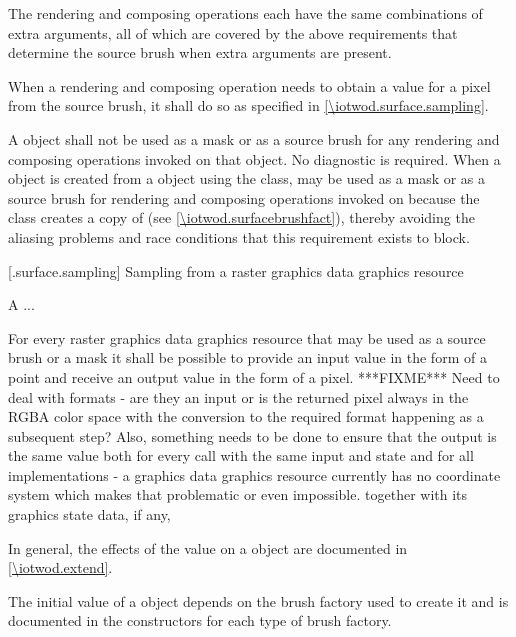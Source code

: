 \pnum
\enternote
The rendering and composing operations each have the same combinations of extra arguments, all of which are covered by the above requirements that determine the source brush when extra arguments are present.
\exitnote

\pnum
When a rendering and composing operation needs to obtain a value for a pixel from the source brush, it shall do so as specified in \ref{\iotwod.surface.sampling}. %

\pnum
A  object shall not be used as a mask or as a source brush for any rendering and composing operations invoked on that  object. No diagnostic is required.
\enternote
When a  object  is created from a  object  using the  class,  may be used as a mask or as a source brush for rendering and composing operations invoked on  because the  class creates a copy of  (see \ref{\iotwod.surfacebrushfact}), thereby avoiding the aliasing problems and race conditions that this requirement exists to block.
\exitnote

 [\iotwod.surface.sampling] {Sampling from a raster graphics data graphics resource}

\pnum
A ...

\pnum
For every raster graphics data graphics resource that may be used as a source brush or a mask it shall be possible to provide an input value in the form of a point and receive an output value in the form of a pixel. ***FIXME*** Need to deal with formats - are they an input or is the returned pixel always in the RGBA color space with the conversion to the required format happening as a subsequent step? Also, something needs to be done to ensure that the output is the same value both for every call with the same input and state and for all implementations - a graphics data graphics resource currently has no coordinate system which makes that problematic or even impossible. together with its graphics state data, if any,

\pnum
In general, the effects of the  value on a  object are documented in \ref{\iotwod.extend}.

\pnum
The initial  value of a  object depends on the brush factory used to create it and is documented in the  constructors for each type of brush factory.

